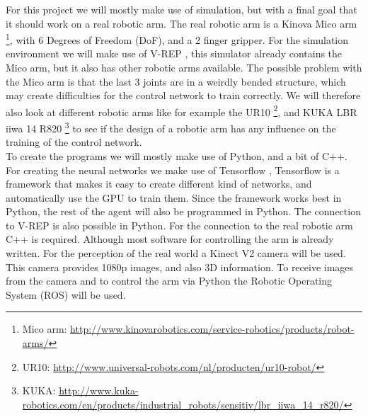 For this project we will mostly make use of simulation, but with a final goal that it should work on a real robotic arm. The real robotic arm is a Kinova Mico arm \footnote{Mico arm: \url{http://www.kinovarobotics.com/service-robotics/products/robot-arms/}}, with 6 Degrees of Freedom (DoF), and a 2 finger gripper. 
For the simulation environment we will make use of V-REP \cite{vrep}, this simulator already contains the Mico arm, but it also has other robotic arms available. The possible problem with the Mico arm is that the last 3 joints
are in a weirdly bended structure, which may create difficulties for the control network to train correctly. We will therefore also look at different robotic arms like for example the UR10 \footnote{UR10: \url{http://www.universal-robots.com/nl/producten/ur10-robot/}}, and 
KUKA LBR iiwa 14 R820 \footnote{KUKA: \url{http://www.kuka-robotics.com/en/products/industrial_robots/sensitiv/lbr_iiwa_14_r820/} } to see if the design of a robotic arm has any influence on the training of the control network. \\
To create the programs we will mostly make use of Python, and a bit of C++. For creating the neural networks we make use of Tensorflow \cite{tensorflow2015-whitepaper}, Tensorflow is a framework that makes it easy to create different kind of 
networks, and automatically use the GPU to train them. Since the framework works best in Python, the rest of the agent will also be programmed in Python. The connection to V-REP is also possible 
in Python. For the connection to the real robotic arm C++ is required. Although most software for controlling the arm is already written. For the perception of the real world a Kinect V2 camera will be used. This camera
provides 1080p images, and also 3D information. To receive images from the camera and to control the arm via Python the Robotic Operating System (ROS) \cite{ros} will be used. 






